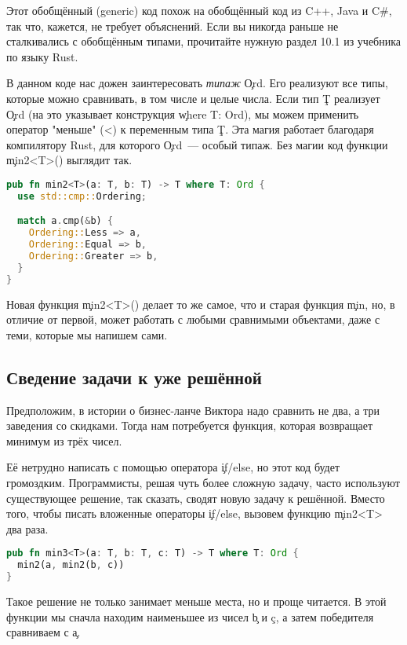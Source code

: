 Этот обобщённый (generic) код похож на обобщённый код из C++, Java и C\#, так что, кажется, не требует объяснений.
Если вы никогда раньше не сталкивались с обобщённым типами, прочитайте нужную раздел 10.1 \cite{rustbook_gdt} из учебника по языку Rust.

В данном коде нас дожен заинтересовать {\em типаж} \c{Ord}.
Его реализуют все типы, которые можно сравнивать, в том числе и целые числа.
Если тип \c{T} реализует \c{Ord} (на это указывает конструкция \c{where T: Ord}), мы можем применить оператор "меньше" (<) к переменным типа \c{T}.
Эта магия работает благодаря компилятору Rust, для которого \c{Ord}~--- особый типаж.
Без магии код функции \c{min2<T>()} выглядит так.

\begin{lstlisting}[language=Rust]
pub fn min2<T>(a: T, b: T) -> T where T: Ord {
  use std::cmp::Ordering;

  match a.cmp(&b) {
    Ordering::Less => a,
    Ordering::Equal => b,
    Ordering::Greater => b,
  }
}
\end{lstlisting}

Новая функция \c{min2<T>()} делает то же самое, что и старая функция \c{min}, но, в отличие от первой, может работать с любыми сравнимыми объектами, даже с теми, которые мы напишем сами.

\subsection{Сведение задачи к уже решённой}

Предположим, в истории о бизнес-ланче Виктора надо сравнить не два, а три заведения со скидками.
Тогда нам потребуется функция, которая возвращает минимум из трёх чисел.

Её нетрудно написать с помощью оператора \c{if/else}, но этот код будет громоздким.
Программисты, решая чуть более сложную задачу, часто используют существующее решение, так сказать, сводят новую задачу к решённой.
Вместо того, чтобы писать вложенные операторы \c{if/else}, вызовем функцию \c{min2<T>} два раза.

\begin{lstlisting}[language=Rust]
pub fn min3<T>(a: T, b: T, c: T) -> T where T: Ord {
  min2(a, min2(b, c))
}
\end{lstlisting}

Такое решение не только занимает меньше места, но и проще читается.
В этой функции мы сначла находим наименьшее из чисел \c{b} и \c{c}, а затем победителя сравниваем с \c{a}.

